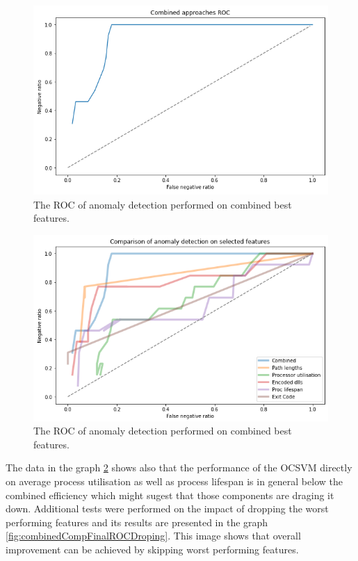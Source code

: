 \documentclass[a4paper,twoside,12pt]{book}
\begin{document}
\begin{figure}
	\centering
	\includegraphics[scale=0.9]{images/CombinedFinalROC}
	\caption{The ROC of anomaly detection performed on combined best features.}
	\label{fig:combinedFinalROC}
 \end{figure}


 \begin{figure}
	\centering
	\includegraphics[scale=0.9]{images/CombinedCompFinalROC}
	\caption{The ROC of anomaly detection performed on combined best features.}
	\label{fig:combinedCompFinalROC}
 \end{figure}

The data in the graph \ref{fig:combinedCompFinalROC} shows also that the performance of the OCSVM directly on average process utilisation
as well as process lifespan is in general below the combined efficiency which might sugest that those components are draging it down. 
Additional tests were performed on the impact of dropping the worst performing features and its results are presented in the
graph \ref{fig:combinedCompFinalROCDroping}. This image shows that overall improvement can be achieved by skipping worst performing features.
\end{document}

